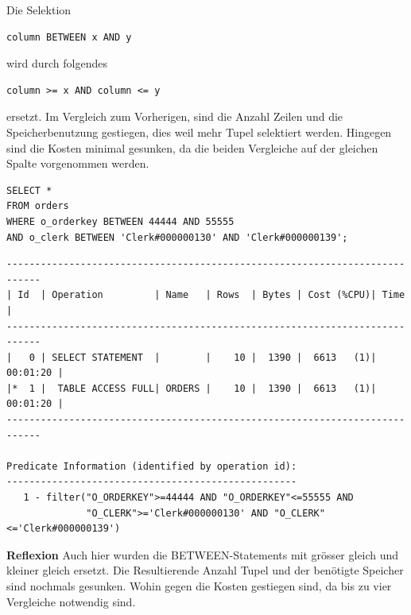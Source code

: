 \documentclass[10pt]{article}
\begin{document}
Die Selektion 
\begin{lstlisting}[style=sqlNoTitle]
column BETWEEN x AND y 
\end{lstlisting}
wird durch folgendes 
\begin{lstlisting}[style=sqlNoTitle]
column >= x AND column <= y 
\end{lstlisting}
ersetzt. Im Vergleich zum Vorherigen, sind die Anzahl Zeilen und die 
Speicherbenutzung gestiegen, dies weil mehr Tupel selektiert werden. Hingegen 
sind die Kosten minimal gesunken, da die beiden Vergleiche auf der gleichen 
Spalte vorgenommen werden.

\begin{lstlisting}[style=sql]
SELECT *
FROM orders
WHERE o_orderkey BETWEEN 44444 AND 55555
AND o_clerk BETWEEN 'Clerk#000000130' AND 'Clerk#000000139';
\end{lstlisting}
\begin{lstlisting}[style=queryexecutionplan]
----------------------------------------------------------------------------
| Id  | Operation         | Name   | Rows  | Bytes | Cost (%CPU)| Time     |
----------------------------------------------------------------------------
|   0 | SELECT STATEMENT  |        |    10 |  1390 |  6613   (1)| 00:01:20 |
|*  1 |  TABLE ACCESS FULL| ORDERS |    10 |  1390 |  6613   (1)| 00:01:20 |
----------------------------------------------------------------------------

Predicate Information (identified by operation id):
---------------------------------------------------
   1 - filter("O_ORDERKEY">=44444 AND "O_ORDERKEY"<=55555 AND 
              "O_CLERK">='Clerk#000000130' AND "O_CLERK"<='Clerk#000000139')
\end{lstlisting}
\textbf{Reflexion} \newline
Auch hier wurden die BETWEEN-Statements mit grösser gleich und kleiner gleich 
ersetzt. Die Resultierende Anzahl Tupel und der benötigte Speicher sind nochmals 
gesunken. Wohin gegen die Kosten gestiegen sind, da bis zu vier Vergleiche 
notwendig sind.
\end{document}
